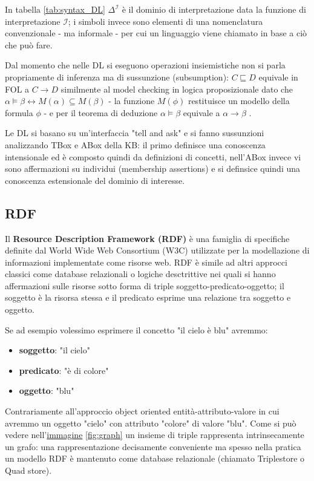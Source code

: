 \documentclass{article}
\begin{document}
In tabella \ref{tab:syntax_DL} $\Delta^{\mathcal{I}}$ è il dominio di interpretazione data la funzione di interpretazione $\mathcal{I}$; i simboli invece sono elementi di una nomenclatura convenzionale - ma informale - per cui un linguaggio viene chiamato in base a ciò che può fare. 

Dal momento che nelle DL si eseguono operazioni insiemistiche non si parla propriamente di inferenza ma di sussunzione (subsumption): $C \sqsubseteq D$ equivale in FOL a $C \rightarrow D$ similmente al model checking in logica proposizionale dato che $\alpha \models \beta \longleftrightarrow M(\alpha) \subseteq M(\beta)$ - la funzione $M(\phi)$ restituisce un modello della formula $\phi$ - e per il teorema di deduzione $\alpha \models \beta$ equivale a $\alpha \rightarrow \beta$ .

Le DL si basano su un'interfaccia "tell and ask" e si fanno sussunzioni analizzando TBox e ABox della KB: il primo definisce una conoscenza intensionale ed è composto quindi da definizioni di concetti, nell'ABox invece vi sono affermazioni su individui (membership assertions) e si definsice quindi una conoscenza estensionale del dominio di interesse.

\subsection{RDF}
Il \textbf{Resource Description Framework (RDF)} è una famiglia di specifiche definite dal World Wide Web Consortium (W3C) utilizzate per la modellazione di informazioni implementate come risorse web. RDF è simile ad altri approcci classici come database relazionali o logiche desctrittive nei quali si hanno affermazioni sulle risorse sotto forma di triple soggetto-predicato-oggetto; il soggetto è la risorsa stessa e il predicato esprime una relazione tra soggetto e oggetto.

Se ad esempio volessimo esprimere il concetto "il cielo è blu" avremmo:
\begin{itemize}
    \item [] \textbf{soggetto}: "il cielo"
    \item [] \textbf{predicato}: "è di colore"
    \item [] \textbf{oggetto}: "blu"
\end{itemize}

Contrariamente all'approccio object oriented entità-attributo-valore in cui avremmo un oggetto "cielo" con attributo "colore" di valore "blu". Come si può vedere nell'\href{https://book.validatingrdf.com/bookHtml008.html}{immagine} \ref{fig:graph} un insieme di triple rappresenta intrinsecamente un grafo: una rappresentazione decisamente conveniente ma spesso nella pratica un modello RDF è mantenuto come database relazionale (chiamato Triplestore o Quad store).
\end{document}
